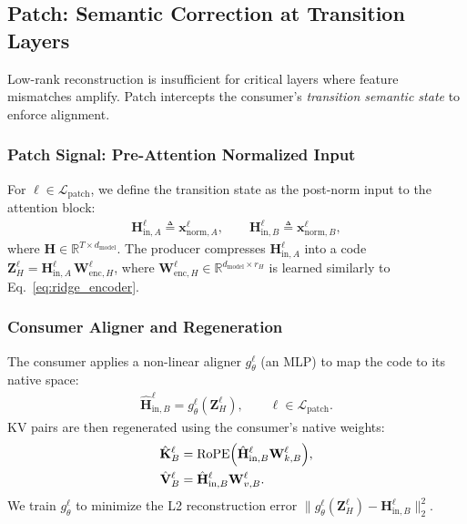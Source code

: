 \documentclass{article}
\theoremstyle{plain}
\theoremstyle{definition}
\theoremstyle{remark}
\begin{document}
\subsection{Patch: Semantic Correction at Transition Layers}
\label{subsec:patch}

Low-rank reconstruction is insufficient for critical layers where feature mismatches amplify.
Patch intercepts the consumer's \emph{transition semantic state} to enforce alignment.

\subsubsection{Patch Signal: Pre-Attention Normalized Input}
For $\ell \in \mathcal{L}_{\mathrm{patch}}$, we define the transition state as the post-norm input to the attention block:
\begin{align}
\mathbf{H}_{\mathrm{in}, A}^\ell \triangleq \mathbf{x}^{\ell}_{\mathrm{norm}, A},
\qquad
\mathbf{H}_{\mathrm{in}, B}^\ell \triangleq \mathbf{x}^{\ell}_{\mathrm{norm}, B},
\end{align}
where $\mathbf{H} \in \mathbb{R}^{T \times d_{\text{model}}}$.
The producer compresses $\mathbf{H}_{\mathrm{in}, A}^\ell$ into a code $\mathbf{Z}_H^{\ell} = \mathbf{H}_{\mathrm{in}, A}^\ell \, \mathbf{W}_{\mathrm{enc}, H}^{\ell}$, where $\mathbf{W}_{\mathrm{enc}, H}^{\ell} \in \mathbb{R}^{d_{\text{model}} \times r_H}$ is learned similarly to Eq.~\eqref{eq:ridge_encoder}.

\subsubsection{Consumer Aligner and Regeneration}
The consumer applies a non-linear aligner $g_{\theta}^{\ell}$ (an MLP) to map the code to its native space:
\begin{align}
\hat{\mathbf{H}}_{\mathrm{in}, B}^\ell = g_{\theta}^{\ell}(\mathbf{Z}_H^{\ell}), \qquad \ell \in \mathcal{L}_{\mathrm{patch}}.
\label{eq:aligner}
\end{align}
KV pairs are then regenerated using the consumer's native weights:
\begin{subequations}
\label{eq:kv_from_patch}
\begin{align}
\hat{\mathbf{K}}_B^{\ell} &= \operatorname{RoPE}\Bigl(\hat{\mathbf{H}}_{\mathrm{in}, B}^\ell \mathbf{W}_{k, B}^{\ell}\Bigr), \\
\hat{\mathbf{V}}_B^{\ell} &= \hat{\mathbf{H}}_{\mathrm{in}, B}^\ell \mathbf{W}_{v, B}^{\ell}.
\end{align}
\end{subequations}
We train $g_{\theta}^{\ell}$ to minimize the L2 reconstruction error $\| g_{\theta}^{\ell}(\mathbf{Z}_H^{\ell}) - \mathbf{H}_{\mathrm{in}, B}^\ell \|_2^2$.
\end{document}
